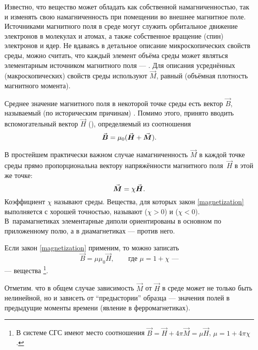 Известно, что вещество может обладать как собственной намагниченностью, так
и изменять свою намагниченность при помещении во внешнее магнитное поле.
Источниками магнитного поля в среде могут служить орбитальное движение электронов
в молекулах и атомах, а также собственное вращение (спин) электронов и ядер.
Не вдаваясь в детальное описание микроскопических свойств среды, можно считать,
что каждый элемент объёма среды может являться элементарным источником
магнитного поля --- . Для описания усреднённых
(макроскопических) свойств среды используют
 $\vec{M}$, равный
 (объёмная плотность магнитного момента).

Среднее значение магнитного поля в некоторой точке среды есть вектор
$\vec{B}$, называемый (по историческим причинам) .
Помимо этого, принято вводить вспомогательный вектор $\vec{H}$
(), определяемый из соотношения
\begin{equation}
    \eqmark{fieldB}
    \vec{B} = \mu_0(\vec{H} + \vec{M}).
\end{equation}

В простейшем практически важном случае намагниченность $\vec{M}$ в каждой
точке среды прямо пропорциональна вектору напряжённости магнитного
поля~$\vec{H}$ в этой же точке:
\begin{equation}
    \eqmark{magnetization}
    \vec{M} = \chi\vec{H}.
\end{equation}
Коэффициент $\chi$ называют  среды.
Вещества, для которых закон \eqref{magnetization} выполняется
с хорошей точностью, называют  ($\chi > 0$) и
 ($\chi < 0$).
В~парамагнетиках элементарные диполи
ориентированы в основном по приложенному полю,
а в диамагнетиках --- против него.

Если закон \eqref{magnetization} применим,
то можно записать
\begin{equation}
    \vec{B} = \mu\mu_0 \vec{H},\qquad \text{где }\mu = 1 + \chi\text{~---}
\end{equation}
---  вещества%
\footnote{В системе СГС имеют место соотношения
    $\vec{B}=\vec{H}+4\pi\vec{M}=\mu\vec{H}$, $\mu = 1 + 4\pi \chi$.}.

Отметим. что в общем случае зависимость $\vec{M}$ от $\vec{H}$ в среде может
не только быть нелинейной, но и зависеть от ``предыстории'' образца ---
значения полей в предыдущие моменты времени
(явление  в ферромагнетиках).




